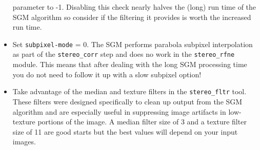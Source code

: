 \begin{itemize}
parameter to -1.  Disabling this check nearly halves the (long) run time of the SGM
algorithm so consider if the filtering it provides is worth the increased run time.
\item Set \texttt{subpixel-mode} = 0.  The SGM performs parabola subpixel interpolation as part of
the \texttt{stereo\_corr} step and does no work in the \texttt{stereo\_rfne} module.  This means that
after dealing with the long SGM processing time you do not need to follow it up with a slow subpixel option!
\item Take advantage of the median and texture filters in the \texttt{stereo\_fltr} tool.  These filters
were designed specifically to clean up output from the SGM algorithm and are especially useful in suppressing
image artifacts in low-texture portions of the image.  A median filter size of 3 and a texture filter size of 11
are good starts but the best values will depend on your input images.
\end{itemize}

